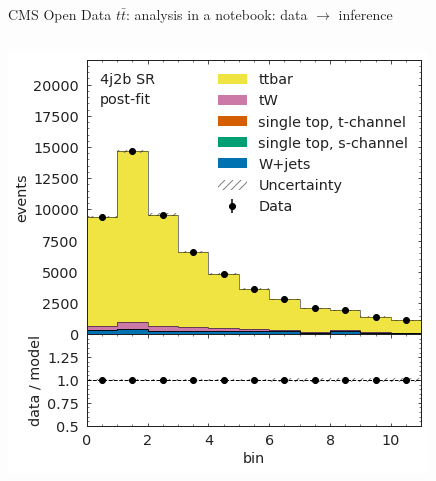 \documentclass[aspectratio=169]{beamer}
\begin{document}
\begin{frame}{CMS Open Data $t\bar{t}$: analysis in a notebook: data $\to$ inference}
\begin{columns}
\begin{columns}
\vfill
\includegraphics[width=\linewidth]{PLOTS/gac-ttbar-plot-8.png}

\end{columns}
\end{columns}
\end{frame}
\end{document}
